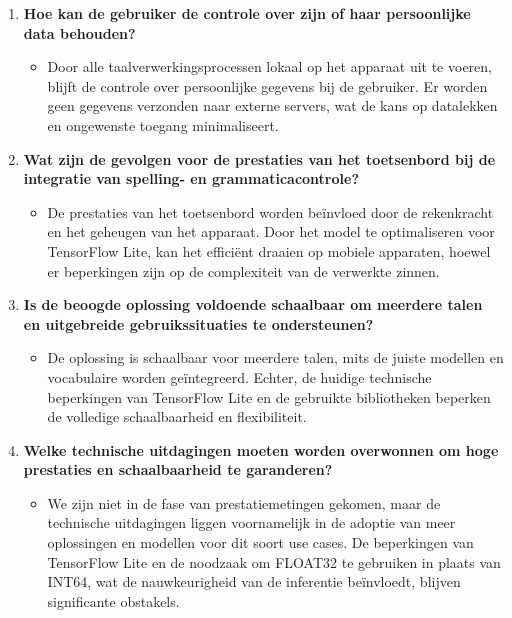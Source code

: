 \begin{enumerate}
    \item \textbf{Hoe kan de gebruiker de controle over zijn of haar persoonlijke data behouden?}
    \begin{itemize}
        \item Door alle taalverwerkingsprocessen lokaal op het apparaat uit te voeren, blijft de controle over persoonlijke gegevens bij de gebruiker. Er worden geen gegevens verzonden naar externe servers, wat de kans op datalekken en ongewenste toegang minimaliseert.
    \end{itemize}
    
    \item \textbf{Wat zijn de gevolgen voor de prestaties van het toetsenbord bij de integratie van spelling- en grammaticacontrole?}
    \begin{itemize}
        \item De prestaties van het toetsenbord worden beïnvloed door de rekenkracht en het geheugen van het apparaat. Door het model te optimaliseren voor TensorFlow Lite, kan het efficiënt draaien op mobiele apparaten, hoewel er beperkingen zijn op de complexiteit van de verwerkte zinnen.
    \end{itemize}
    
    \item \textbf{Is de beoogde oplossing voldoende schaalbaar om meerdere talen en uitgebreide gebruikssituaties te ondersteunen?}
    \begin{itemize}
        \item De oplossing is schaalbaar voor meerdere talen, mits de juiste modellen en vocabulaire worden geïntegreerd. Echter, de huidige technische beperkingen van TensorFlow Lite en de gebruikte bibliotheken beperken de volledige schaalbaarheid en flexibiliteit.
    \end{itemize}
    
    \item \textbf{Welke technische uitdagingen moeten worden overwonnen om hoge prestaties en schaalbaarheid te garanderen?}
    \begin{itemize}
        \item We zijn niet in de fase van prestatiemetingen gekomen, maar de technische uitdagingen liggen voornamelijk in de adoptie van meer oplossingen en modellen voor dit soort use cases. De beperkingen van TensorFlow Lite en de noodzaak om FLOAT32 te gebruiken in plaats van INT64, wat de nauwkeurigheid van de inferentie beïnvloedt, blijven significante obstakels.
    \end{itemize}
\end{enumerate}

